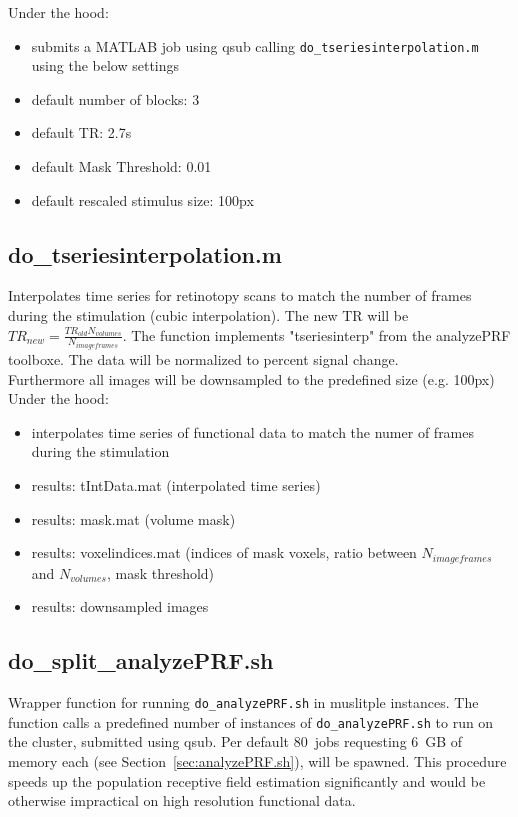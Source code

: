 \documentclass[12pt,a4paper]{scrartcl}
\begin{document}
\noindent Under the hood:
\begin{itemize}
\item submits a MATLAB job using qsub calling \texttt{do\_tseriesinterpolation.m} using the below settings
\item default number of blocks: 3
\item default TR: 2.7s
\item default Mask Threshold: 0.01
\item default rescaled stimulus size: 100px
\end{itemize}

\subsection{do\_tseriesinterpolation.m}
Interpolates time series for retinotopy scans to match the number of frames during the stimulation (cubic interpolation). The new TR will be $TR_{new}=\frac{TR_{old}N_{volumes}}{N_{imageframes}}$. The function implements "tseriesinterp" from the analyzePRF toolboxe. The data will be normalized to percent signal change.\\

\noindent Furthermore all images will be downsampled to the predefined size (e.g. 100px)\\

\noindent Under the hood:
\begin{itemize}
\item interpolates time series of functional data to match the numer of frames during the stimulation
\item results: tIntData.mat (interpolated time series)
\item results: mask.mat (volume mask)
\item results: voxelindices.mat (indices of mask voxels, ratio between $N_{imageframes}$ and $N_{volumes}$, mask threshold)
\item results: downsampled images
\end{itemize}

\subsection{do\_split\_analyzePRF.sh}
\label{sec:splitanalyzePRF.sh}
Wrapper function for running \texttt{do\_analyzePRF.sh} in muslitple instances. The function calls a predefined number of instances of \texttt{do\_analyzePRF.sh} to run on the cluster, submitted using qsub. Per default 80~jobs requesting 6~GB of memory each (see Section~\ref{sec:analyzePRF.sh}), will be spawned. This procedure speeds up the population receptive field estimation significantly and would be otherwise impractical on high resolution functional data.\\
\end{document}
